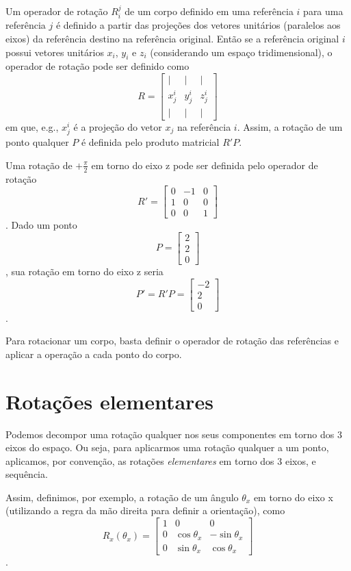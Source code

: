 
Um operador de rotação $R_i^{j}$ de um corpo definido em uma referência $i$ para uma referência $j$ é definido a partir das projeções dos vetores unitários (paralelos aos eixos) da referência destino na referência original. Então se a referência original $i$ possui vetores unitários $x_i$, $y_i$ e $z_i$ (considerando um espaço tridimensional), o operador de rotação pode ser definido como \[
    R = \begin{bmatrix} | & | & | \\ x^{i}_j & y^{i}_j & z_j^{i} \\ | & | & | \end{bmatrix} 
\] em que, e.g., $x_j^{i}$ é a projeção do vetor $x_j$ na referência $i$. Assim, a rotação de um ponto qualquer $P$ é definida pelo produto matricial $R'P$.

\begin{eg}
    Uma rotação de $+\frac{\pi}{2}$ em torno do eixo z pode ser definida pelo operador de rotação \[
	R' = \begin{bmatrix} 0 & -1 & 0 \\ 1 & 0 & 0 \\ 0 & 0 & 1 \end{bmatrix} 
    \]. Dado um ponto \[
    P = \begin{bmatrix} 2 \\ 2 \\ 0 \end{bmatrix} 
    \], sua rotação em torno do eixo z seria \[
    P' = R'P = \begin{bmatrix} -2 \\ 2 \\ 0 \end{bmatrix} 
    \].
\end{eg}

Para rotacionar um corpo, basta definir o operador de rotação das referências e aplicar a operação a cada ponto do corpo.

\section*{Rotações elementares}

Podemos decompor uma rotação qualquer nos seus componentes em torno dos 3 eixos do espaço. Ou seja, para aplicarmos uma rotação qualquer a um ponto, aplicamos, por convenção, as rotações \emph{elementares} em torno dos 3 eixos, e sequência.

Assim, definimos, por exemplo, a rotação de um ângulo $\theta_x$ em torno do eixo x (utilizando a regra da mão direita para definir a orientação), como \[
    R_x\left( \theta_x \right) = \begin{bmatrix} 1 & 0 & 0 \\ 0 & \cos\theta_x & - \sin\theta_x \\ 0 & \sin\theta_x & \cos\theta_x \end{bmatrix} 
\].

